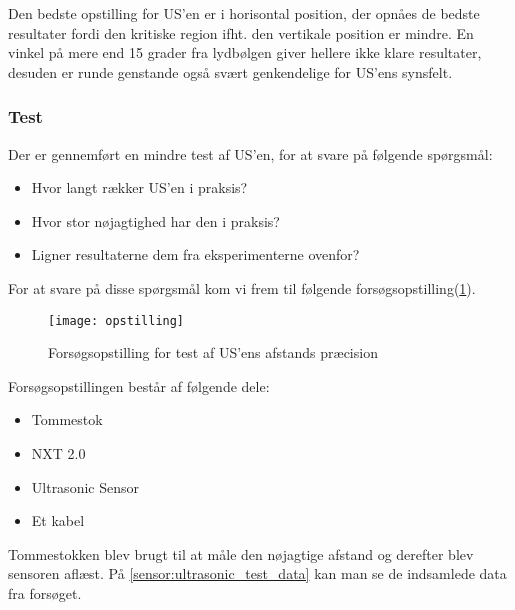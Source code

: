 Den bedste opstilling for US'en er i horisontal position, der opnåes de bedste resultater fordi den kritiske region ifht. den vertikale position er mindre.
En vinkel på mere end 15 grader fra lydbølgen giver hellere ikke klare resultater, desuden er runde genstande også svært genkendelige for US'ens synsfelt.

\subsubsection{Test}
Der er gennemført en mindre test af US'en, for at svare på følgende spørgsmål:

\begin{itemize}
\item Hvor langt rækker US'en i praksis?
\item Hvor stor nøjagtighed har den i praksis?
\item Ligner resultaterne dem fra eksperimenterne ovenfor?
\end{itemize}

For at svare på disse spørgsmål kom vi frem til følgende forsøgsopstilling(\ref{sensor:ultrasonic_opstilling}).

\begin{figure}[h]
\centering
\texttt{[image: opstilling]}
\caption{Forsøgsopstilling for test af US'ens afstands præcision}
\label{sensor:ultrasonic_opstilling}
\end{figure}

Forsøgsopstillingen består af følgende dele:
\begin{itemize}
\item Tommestok
\item NXT 2.0
\item \legoms Ultrasonic Sensor
\item Et \legoms kabel
\end{itemize}

Tommestokken blev brugt til at måle den nøjagtige afstand og derefter blev sensoren aflæst.
På \cref{sensor:ultrasonic_test_data} kan man se de indsamlede data fra forsøget.

